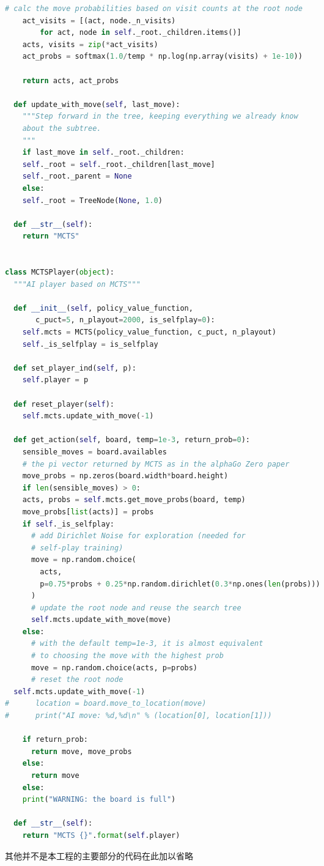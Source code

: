 \documentclass[a4paper]{article}
\begin{document}
\begin{multicols}{2}
\begin{lstlisting}[language=Python,breaklines = true,columns=flexible]
    # calc the move probabilities based on visit counts at the root node
    act_visits = [(act, node._n_visits)
        for act, node in self._root._children.items()]
    acts, visits = zip(*act_visits)
    act_probs = softmax(1.0/temp * np.log(np.array(visits) + 1e-10))

    return acts, act_probs

  def update_with_move(self, last_move):
    """Step forward in the tree, keeping everything we already know
    about the subtree.
    """
    if last_move in self._root._children:
    self._root = self._root._children[last_move]
    self._root._parent = None
    else:
    self._root = TreeNode(None, 1.0)

  def __str__(self):
    return "MCTS"


class MCTSPlayer(object):
  """AI player based on MCTS"""

  def __init__(self, policy_value_function,
       c_puct=5, n_playout=2000, is_selfplay=0):
    self.mcts = MCTS(policy_value_function, c_puct, n_playout)
    self._is_selfplay = is_selfplay

  def set_player_ind(self, p):
    self.player = p

  def reset_player(self):
    self.mcts.update_with_move(-1)

  def get_action(self, board, temp=1e-3, return_prob=0):
    sensible_moves = board.availables
    # the pi vector returned by MCTS as in the alphaGo Zero paper
    move_probs = np.zeros(board.width*board.height)
    if len(sensible_moves) > 0:
    acts, probs = self.mcts.get_move_probs(board, temp)
    move_probs[list(acts)] = probs
    if self._is_selfplay:
      # add Dirichlet Noise for exploration (needed for
      # self-play training)
      move = np.random.choice(
        acts,
        p=0.75*probs + 0.25*np.random.dirichlet(0.3*np.ones(len(probs)))
      )
      # update the root node and reuse the search tree
      self.mcts.update_with_move(move)
    else:
      # with the default temp=1e-3, it is almost equivalent
      # to choosing the move with the highest prob
      move = np.random.choice(acts, p=probs)
      # reset the root node
  self.mcts.update_with_move(-1)
#      location = board.move_to_location(move)
#      print("AI move: %d,%d\n" % (location[0], location[1]))

    if return_prob:
      return move, move_probs
    else:
      return move
    else:
    print("WARNING: the board is full")

  def __str__(self):
    return "MCTS {}".format(self.player)
  \end{lstlisting}
  其他并不是本工程的主要部分的代码在此加以省略

\end{multicols}
\end{document}

